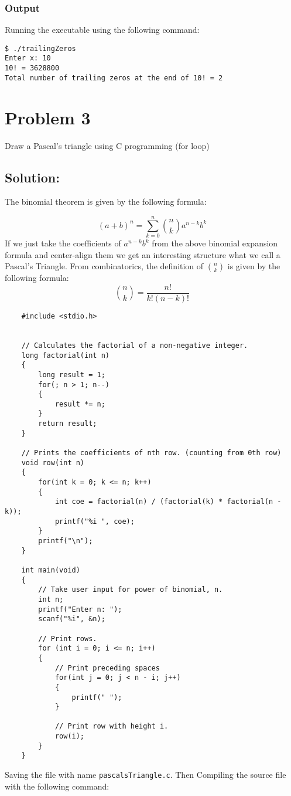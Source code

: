 \documentclass[12pt, letterpaper]{report}
\begin{document}
\subsubsection*{Output}
Running the executable using the following command:
\begin{verbatim}
$ ./trailingZeros
Enter x: 10
10! = 3628800
Total number of trailing zeros at the end of 10! = 2
\end{verbatim}


\section*{Problem 3}
{\large Draw a Pascal’s triangle using C
programming (for loop)}

\subsection*{Solution:}
The binomial theorem is given by the following formula:

\begin{displaymath}
(a + b)^n = \sum_{k = 0}^n \binom{n}{k} a^{n - k}b^k
\end{displaymath}
If we just take the coefficients of $a^{n - k}b^k$ from the above binomial expansion formula and center-align them we get an
interesting structure what we call a Pascal's Triangle. From combinatorics, the definition of $\binom{n}{k}$ is given by the following formula: 
\begin{displaymath}
\binom{n}{k} = \frac{n!}{k!(n - k)!}
\end{displaymath}

\begin{verbatim}
    #include <stdio.h>


    // Calculates the factorial of a non-negative integer.
    long factorial(int n)
    {
        long result = 1;
        for(; n > 1; n--)
        {
            result *= n;
        }
        return result;
    }

    // Prints the coefficients of nth row. (counting from 0th row)
    void row(int n)
    {
        for(int k = 0; k <= n; k++)
        {
            int coe = factorial(n) / (factorial(k) * factorial(n - k));
            printf("%i ", coe);
        }
        printf("\n");
    }

    int main(void)
    {
        // Take user input for power of binomial, n.
        int n;
        printf("Enter n: ");
        scanf("%i", &n);

        // Print rows.
        for (int i = 0; i <= n; i++)
        {
            // Print preceding spaces
            for(int j = 0; j < n - i; j++)
            {
                printf(" ");
            }

            // Print row with height i.
            row(i);
        }
    }

\end{verbatim}
Saving the file with name \texttt{pascalsTriangle.c}. Then Compiling the source file with the following command:
\end{document}
